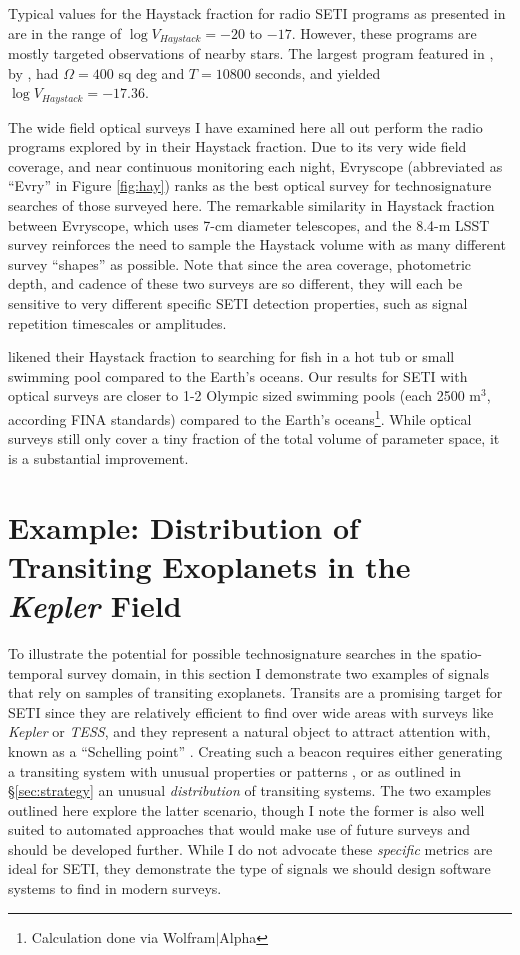 \documentclass[twocolumn]{aastex62}
\newcommand{\Kepler}{\textsl{Kepler}\xspace}
\newcommand{\TESS}{\textsl{TESS}\xspace}
\begin{document}
Typical values for the Haystack fraction for radio SETI programs as presented in \citet{wright2018c}  are in the range of $\log V_{Haystack} =  -20$ to $-17$. However, these programs are mostly targeted observations of nearby stars. The largest program featured in \citet{wright2018c}, by \citet{tingay2018}, had $\Omega=400$ sq deg and $T=10800$ seconds, and yielded $\log V_{Haystack} =  -17.36$.

The wide field optical surveys I have examined here all out perform the radio programs explored by \citet{wright2018c} in their Haystack fraction. Due to its very wide field coverage, and near continuous monitoring each night, Evryscope (abbreviated as ``Evry'' in Figure \ref{fig:hay}) ranks as the best optical survey for technosignature searches of those surveyed here. The remarkable similarity in Haystack fraction between Evryscope, which uses 7-cm diameter telescopes, and the 8.4-m LSST survey reinforces the need to sample the Haystack volume with as many different survey ``shapes'' as possible. Note that since the area coverage, photometric depth, and cadence of these two surveys are so different, they will each be sensitive to very different specific SETI detection properties, such as signal repetition timescales or amplitudes.

\citet{wright2018c} likened their Haystack fraction to searching for fish in a hot tub or small swimming pool compared to the Earth's oceans. Our results for SETI with optical surveys are closer to 1-2 Olympic sized swimming pools (each 2500 m$^3$, according FINA standards) compared to the Earth's oceans\footnote{Calculation done via Wolfram$|$Alpha}. While optical surveys still only cover a tiny fraction of the total volume of parameter space, it is a substantial improvement.




\section{Example: Distribution of Transiting Exoplanets in the {\it Kepler} Field}
\label{sec:transit}

To illustrate the potential for possible technosignature searches in the spatio-temporal survey domain, in this section I demonstrate two examples of signals that rely on samples of transiting exoplanets. Transits are a promising target for SETI since they are relatively efficient to find over wide areas with surveys like \Kepler \citep{borucki2010} or \TESS, and they represent a natural object to attract attention with, known as a ``Schelling point'' \citep{wright2017}. Creating such a beacon requires either generating a transiting system with unusual properties or patterns \citep[e.g.][]{arnold2005,kipping2016,forgan2017}, or as outlined in \S\ref{sec:strategy} an unusual {\it distribution} of transiting systems. The two examples outlined here explore the latter scenario, though I note the former is also well suited to automated approaches that would make use of future surveys and should be developed further. While I do not advocate these {\it specific} metrics are ideal for SETI, they demonstrate the type of signals we should design software systems to find in modern surveys.
\end{document}
